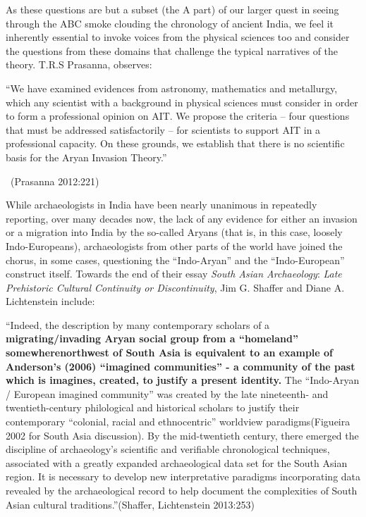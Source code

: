 As these questions are but a subset (the A part) of our larger quest in seeing through the ABC smoke clouding the chronology of ancient India, we feel it inherently essential to invoke voices from the physical sciences too and consider the questions from these domains that challenge the typical narratives of the theory. T.R.S Prasanna, observes:

\begin{myquote}
“We have examined evidences from astronomy, mathematics and metallurgy, which any scientist with a background in physical sciences must consider in order to form a professional opinion on AIT. We propose the criteria – four questions that must be addressed satisfactorily – for scientists to support AIT in a professional capacity. On these grounds, we establish that there is no scientific basis for the Aryan Invasion Theory.”

~\hfill (Prasanna 2012:221)
\end{myquote}

While archaeologists in India have been nearly unanimous in repeatedly reporting, over many decades now, the lack of any evidence for either an invasion or a migration into India by the so-called Aryans (that is, in this case, loosely Indo-Europeans), archaeologists from other parts of the world have joined the chorus, in some cases, questioning the “Indo-Aryan” and the “Indo-European” construct itself. Towards the end of their essay \textit{South Asian Archaeology}: \textit{Late Prehistoric Cultural Continuity or Discontinuity}, Jim G. Shaffer and Diane A. Lichtenstein include:

\begin{myquote}
“Indeed, the description by many contemporary scholars of a \textbf{migrating/invading Aryan social group from a “homeland” somewhere\break northwest of South Asia is equivalent to an example of Anderson’s (2006) “imagined communities” - a community of the past which is imagines, created, to justify a present identity.} The “Indo-Aryan / European imagined community” was created by the late nineteenth- and twentieth-century philological and historical scholars to justify their contemporary “colonial, racial and ethnocentric” worldview paradigms\break (Figueira 2002 for South Asia discussion). By the mid-twentieth century, there emerged the discipline of archaeology’s scientific and verifiable chronological techniques, associated with a greatly expanded archaeological data set for the South Asian region. It is necessary to develop new interpretative paradigms incorporating data revealed by the archaeological record to help document the complexities of South Asian cultural traditions.”\hfill (Shaffer, Lichtenstein 2013:253)
\end{myquote}

